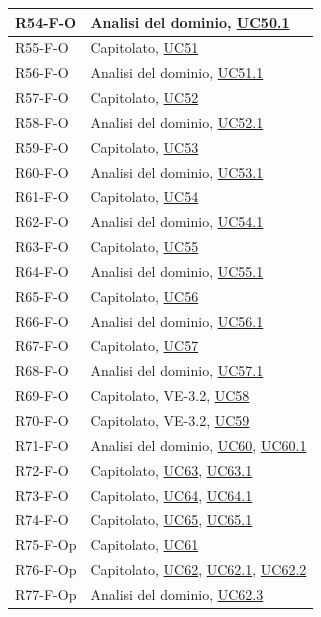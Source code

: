 \begin{longtable}{|p{2.8cm}|p{10.2cm}|}
	R54-F-O & Analisi del dominio, \hyperlink{uc50.1}{UC50.1} \\ \hline
	R55-F-O & Capitolato, \hyperlink{uc51}{UC51} \\ \hline
	R56-F-O & Analisi del dominio, \hyperlink{uc51.1}{UC51.1} \\ \hline
	R57-F-O & Capitolato, \hyperlink{uc52}{UC52} \\ \hline
	R58-F-O & Analisi del dominio, \hyperlink{uc52.1}{UC52.1} \\ \hline
	R59-F-O & Capitolato, \hyperlink{uc53}{UC53} \\ \hline
	R60-F-O & Analisi del dominio, \hyperlink{uc53.1}{UC53.1} \\ \hline
	R61-F-O & Capitolato, \hyperlink{uc54}{UC54} \\ \hline
	R62-F-O & Analisi del dominio, \hyperlink{uc54.1}{UC54.1} \\ \hline
	R63-F-O & Capitolato, \hyperlink{uc55}{UC55} \\ \hline
	R64-F-O & Analisi del dominio, \hyperlink{uc55.1}{UC55.1} \\ \hline
	R65-F-O & Capitolato, \hyperlink{uc56}{UC56} \\ \hline
	R66-F-O & Analisi del dominio, \hyperlink{uc56.1}{UC56.1} \\ \hline
	R67-F-O & Capitolato, \hyperlink{uc57}{UC57} \\ \hline
	R68-F-O & Analisi del dominio, \hyperlink{uc57.1}{UC57.1} \\ \hline
	R69-F-O & Capitolato, VE-3.2, \hyperlink{uc58}{UC58} \\ \hline
	R70-F-O & Capitolato, VE-3.2, \hyperlink{uc59}{UC59} \\ \hline
	R71-F-O & Analisi del dominio, \hyperlink{uc60}{UC60}, \hyperlink{uc60.1}{UC60.1} \\ \hline
	R72-F-O & Capitolato, \hyperlink{uc63}{UC63}, \hyperlink{uc63.1}{UC63.1} \\ \hline
	R73-F-O & Capitolato, \hyperlink{uc64}{UC64}, \hyperlink{uc64.1}{UC64.1} \\ \hline
	R74-F-O & Capitolato, \hyperlink{uc65}{UC65}, \hyperlink{uc65.1}{UC65.1} \\ \hline
	R75-F-Op & Capitolato, \hyperlink{uc61}{UC61} \\ \hline
	R76-F-Op & Capitolato, \hyperlink{uc62}{UC62}, \hyperlink{uc62.1}{UC62.1}, \hyperlink{uc62.2}{UC62.2} \\ \hline
	R77-F-Op & Analisi del dominio, \hyperlink{uc62.3}{UC62.3} \\ \hline

\end{longtable}
